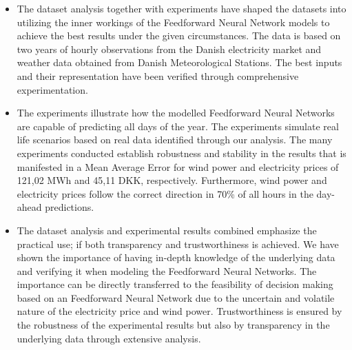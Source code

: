 \begin{itemize}
\item The dataset analysis together with experiments have shaped the datasets into utilizing the inner workings of the Feedforward Neural Network models to achieve the best results under the given circumstances. The data is based on two years of hourly observations from the Danish electricity market and weather data obtained from Danish Meteorological Stations. The best inputs and their representation have been verified through comprehensive experimentation.   
\item The experiments illustrate how the modelled Feedforward Neural Networks are capable of predicting all days of the year. The experiments simulate real life scenarios based on real data identified through our analysis. The many experiments conducted establish robustness and stability in the results that is manifested in a Mean Average Error for wind power and electricity prices of 121,02 MWh and 45,11 DKK, respectively. Furthermore, wind power and electricity prices follow the correct direction in 70\% of all hours in the day-ahead predictions. 
\item The dataset analysis and experimental results combined emphasize the practical use; if both transparency and trustworthiness is achieved. We have shown the importance of having in-depth knowledge of the underlying data and verifying it when modeling the Feedforward Neural Networks. The importance can be directly transferred to the feasibility of decision making based on an Feedforward Neural Network due to the uncertain and volatile nature of the electricity price and wind power. Trustworthiness is ensured by the robustness of the experimental results but also by transparency in the underlying data through extensive analysis. 
\end{itemize}

